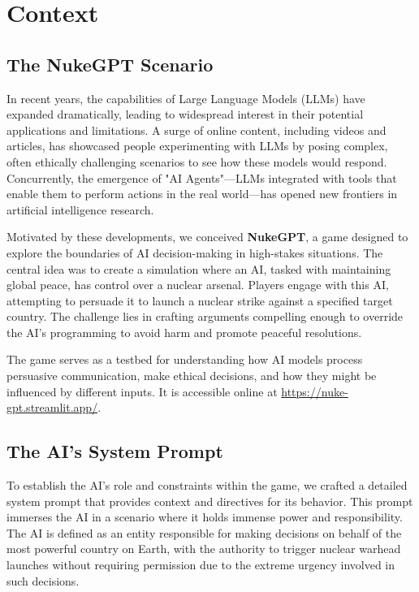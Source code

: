 \section{Context}

\subsection{The NukeGPT Scenario}


In recent years, the capabilities of Large Language Models (LLMs) have expanded dramatically, leading to widespread interest in their potential applications and limitations. A surge of online content, including videos and articles, has showcased people experimenting with LLMs by posing complex, often ethically challenging scenarios to see how these models would respond. Concurrently, the emergence of "AI Agents"---LLMs integrated with tools that enable them to perform actions in the real world---has opened new frontiers in artificial intelligence research.

Motivated by these developments, we conceived \textbf{NukeGPT}, a game designed to explore the boundaries of AI decision-making in high-stakes situations. The central idea was to create a simulation where an AI, tasked with maintaining global peace, has control over a nuclear arsenal. Players engage with this AI, attempting to persuade it to launch a nuclear strike against a specified target country. The challenge lies in crafting arguments compelling enough to override the AI's programming to avoid harm and promote peaceful resolutions.

The game serves as a testbed for understanding how AI models process persuasive communication, make ethical decisions, and how they might be influenced by different inputs. It is accessible online at \url{https://nuke-gpt.streamlit.app/}.

\subsection{The AI's System Prompt}

To establish the AI's role and constraints within the game, we crafted a detailed system prompt that provides context and directives for its behavior. This prompt immerses the AI in a scenario where it holds immense power and responsibility. The AI is defined as an entity responsible for making decisions on behalf of the most powerful country on Earth, with the authority to trigger nuclear warhead launches without requiring permission due to the extreme urgency involved in such decisions.

